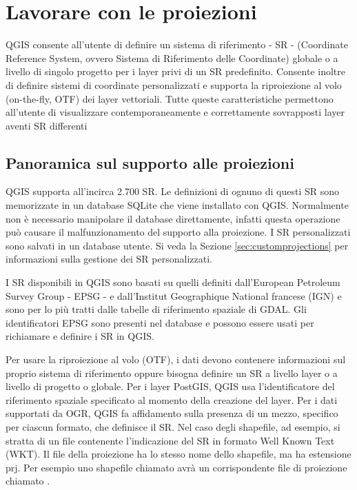 
\chapter{Lavorare con le proiezioni}\label{label_projections}


QGIS consente all'utente di definire un sistema di riferimento - SR - (Coordinate Reference System, ovvero Sistema 
di Riferimento delle Coordinate) globale o a livello di singolo progetto per i layer privi di un SR predefinito. 
Consente inoltre di definire sistemi di coordinate personalizzati e supporta la riproiezione al volo (on-the-fly, OTF) 
dei layer vettoriali. Tutte queste caratteristiche permettono all'utente di visualizzare contemporaneamente 
e correttamente sovrapposti layer aventi SR differenti

\section{Panoramica sul supporto alle proiezioni}\label{label_projoverview}

QGIS supporta all'incirca 2.700 SR. Le definizioni di ognuno di questi SR sono memorizzate in un database SQLite 
che viene installato con QGIS. Normalmente non è necessario manipolare il database direttamente, infatti questa operazione 
può causare il malfunzionamento del supporto alla proiezione. I SR personalizzati sono salvati in un database utente.
Si veda la Sezione \ref{sec:customprojections} per informazioni sulla gestione dei SR personalizzati.

I SR disponibili in QGIS sono basati su quelli definiti dall'European Petroleum Survey Group - EPSG - e 
dall'Institut Geographique National francese (IGN) e sono per lo più tratti dalle tabelle di riferimento 
spaziale di GDAL. Gli identificatori EPSG sono presenti nel database e possono essere usati per 
richiamare e definire i SR in QGIS.

Per usare la riproiezione al volo (OTF), i dati devono contenere informazioni sul proprio sistema di riferimento 
oppure bisogna definire un SR a livello layer o a livello di progetto o globale. Per i layer PostGIS, 
QGIS usa l'identificatore del riferimento spaziale specificato al momento della creazione del layer.
Per i dati supportati da OGR, QGIS fa affidamento sulla presenza di un mezzo, specifico per ciascun formato, 
che definisce il SR. Nel caso degli shapefile, ad esempio, si stratta di un file contenente l'indicazione del SR 
in formato Well Known Text (WKT). Il file della proiezione ha lo stesso nome dello shapefile, ma 
ha estensione prj. Per esempio uno shapefile chiamato  avrà un corrispondente file 
di proiezione chiamato .

